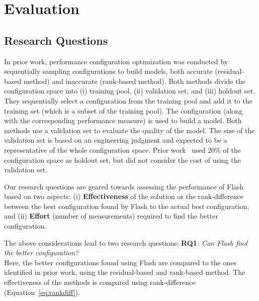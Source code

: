 \documentclass[10pt,journal,compsoc]{IEEEtran}
\newcommand{\flash}{{\sc Flash}\xspace}
\begin{document}
\section{Evaluation}



\subsection{Research Questions}

In prior work, performance configuration optimization was conducted by sequentially sampling configurations to build models, both accurate (residual-based method) and inaccurate (rank-based method). 
Both methods divide the configuration space into (i) training pool, (ii) validation set, and (iii) holdout set. They sequentially select a configuration from the training pool and add it to the training set (which is a subset of the training pool). The configuration (along with the corresponding performance measure) is used to build a model. Both methods use a validation set to evaluate the quality of the model. The size of the validation set is based on an engineering judgment and expected to be a representative of the whole configuration space. Prior work~\cite{nair2017using} used 20\% of the configuration space as holdout set, but did not consider the cost of using the validation set.%

Our research questions are geared towards assessing the performance of \flash based on two aspects: (i) \textbf{Effectiveness} of the solution or the rank-difference between the best configuration found by \flash to the actual best configuration, and (ii) \textbf{Effort} (number of measurements) required to find the better configuration.

\noindent The above considerations lead to two research questions:
\noindent\textbf{RQ1}\textit{: Can  \flash find the better configuration?}\\
Here, the better configurations found using \flash are compared to the ones identified in prior work, using the residual-based and rank-based method. The effectiveness of the methods is compared using rank-difference (Equation~\ref{eq:rankdiff}). 
\end{document}
